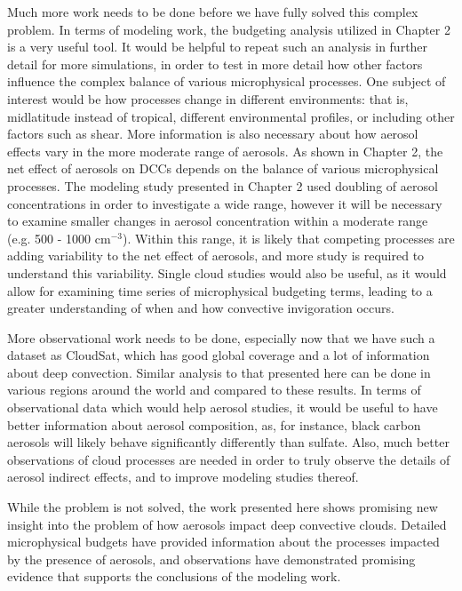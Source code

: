 Much more work needs to be done before we have fully solved this complex problem.  In terms of modeling work, the budgeting analysis utilized in Chapter 2 is a very useful tool.  It would be helpful to repeat such an analysis in further detail for more simulations, in order to test in more detail how other factors influence the complex balance of various microphysical processes.  One subject of interest would be how processes change in different environments: that is, midlatitude instead of tropical, different environmental profiles, or including other factors such as shear.  
\newpage
More information is also necessary about how aerosol effects vary in the more moderate range of aerosols.  As shown in Chapter 2, the net effect of aerosols on DCCs depends on the balance of various microphysical processes.  The modeling study presented in Chapter 2 used doubling of aerosol concentrations in order to investigate a wide range, however it will be necessary to examine smaller changes in aerosol concentration within a moderate range (e.g. 500 - 1000 cm$^{-3}$).  Within this range, it is likely that competing processes are adding variability to the net effect of aerosols, and more study is required to understand this variability.  Single cloud studies would also be useful, as it would allow for examining time series of microphysical budgeting terms, leading to a greater understanding of when and how convective invigoration occurs.  

More observational work needs to be done, especially now that we have such a dataset as CloudSat, which has good global coverage and a lot of information about deep convection.  Similar analysis to that presented here can be done in various regions around the world and compared to these results.  In terms of observational data which would help aerosol studies, it would be useful to have better information about aerosol composition, as, for instance, black carbon aerosols will likely behave significantly differently than sulfate.  Also, much better observations of cloud processes are needed in order to truly observe the details of aerosol indirect effects, and to improve modeling studies thereof.

While the problem is not solved, the work presented here shows promising new insight into the problem of how aerosols impact deep convective clouds.  Detailed microphysical budgets have provided information about the processes impacted by the presence of aerosols, and observations have demonstrated promising evidence that supports the conclusions of the modeling work.
